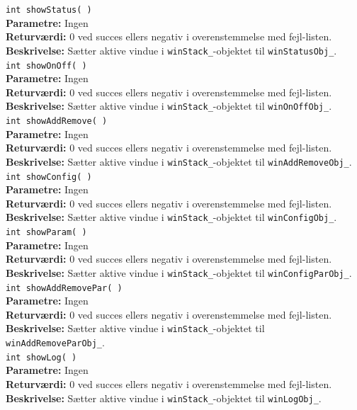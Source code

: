 \verb+int showStatus( )+\\
\textbf{Parametre:} Ingen \\
\textbf{Returværdi:} 0 ved succes ellers negativ i overenstemmelse med fejl-listen. \\
\textbf{Beskrivelse:} Sætter aktive vindue i \verb+winStack_+-objektet til \verb+winStatusObj_+.\\

\verb+int showOnOff( )+\\
\textbf{Parametre:} Ingen \\
\textbf{Returværdi:} 0 ved succes ellers negativ i overenstemmelse med fejl-listen. \\
\textbf{Beskrivelse:} Sætter aktive vindue i \verb+winStack_+-objektet til \verb+winOnOffObj_+.\\

\verb+int showAddRemove( )+\\
\textbf{Parametre:} Ingen \\
\textbf{Returværdi:} 0 ved succes ellers negativ i overenstemmelse med fejl-listen. \\
\textbf{Beskrivelse:} Sætter aktive vindue i \verb+winStack_+-objektet til \verb+winAddRemoveObj_+.\\

\verb+int showConfig( )+\\
\textbf{Parametre:} Ingen \\
\textbf{Returværdi:} 0 ved succes ellers negativ i overenstemmelse med fejl-listen. \\
\textbf{Beskrivelse:} Sætter aktive vindue i \verb+winStack_+-objektet til \verb+winConfigObj_+.\\

\verb+int showParam( )+\\
\textbf{Parametre:} Ingen \\
\textbf{Returværdi:} 0 ved succes ellers negativ i overenstemmelse med fejl-listen. \\
\textbf{Beskrivelse:} Sætter aktive vindue i \verb+winStack_+-objektet til \verb+winConfigParObj_+.\\

\verb+int showAddRemovePar( )+\\
\textbf{Parametre:} Ingen \\
\textbf{Returværdi:} 0 ved succes ellers negativ i overenstemmelse med fejl-listen. \\
\textbf{Beskrivelse:} Sætter aktive vindue i \verb+winStack_+-objektet til \verb+winAddRemoveParObj_+.\\

\verb+int showLog( )+\\
\textbf{Parametre:} Ingen \\
\textbf{Returværdi:} 0 ved succes ellers negativ i overenstemmelse med fejl-listen. \\
\textbf{Beskrivelse:} Sætter aktive vindue i \verb+winStack_+-objektet til \verb+winLogObj_+.\\

